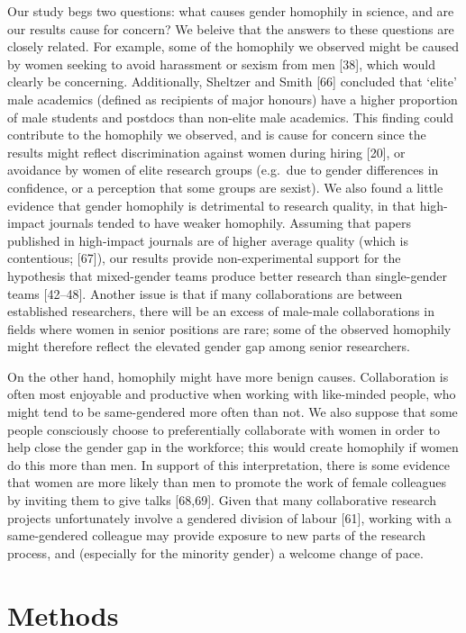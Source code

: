 \documentclass[12pt,]{article}
\begin{document}
Our study begs two questions: what causes gender homophily in science,
and are our results cause for concern? We beleive that the answers to
these questions are closely related. For example, some of the homophily
we observed might be caused by women seeking to avoid harassment or
sexism from men {[}38{]}, which would clearly be concerning.
Additionally, Sheltzer and Smith {[}66{]} concluded that `elite' male
academics (defined as recipients of major honours) have a higher
proportion of male students and postdocs than non-elite male academics.
This finding could contribute to the homophily we observed, and is cause
for concern since the results might reflect discrimination against women
during hiring {[}20{]}, or avoidance by women of elite research groups
(e.g.~due to gender differences in confidence, or a perception that some
groups are sexist). We also found a little evidence that gender
homophily is detrimental to research quality, in that high-impact
journals tended to have weaker homophily. Assuming that papers published
in high-impact journals are of higher average quality (which is
contentious; {[}67{]}), our results provide non-experimental support for
the hypothesis that mixed-gender teams produce better research than
single-gender teams {[}42--48{]}. Another issue is that if many
collaborations are between established researchers, there will be an
excess of male-male collaborations in fields where women in senior
positions are rare; some of the observed homophily might therefore
reflect the elevated gender gap among senior researchers.

On the other hand, homophily might have more benign causes.
Collaboration is often most enjoyable and productive when working with
like-minded people, who might tend to be same-gendered more often than
not. We also suppose that some people consciously choose to
preferentially collaborate with women in order to help close the gender
gap in the workforce; this would create homophily if women do this more
than men. In support of this interpretation, there is some evidence that
women are more likely than men to promote the work of female colleagues
by inviting them to give talks {[}68,69{]}. Given that many
collaborative research projects unfortunately involve a gendered
division of labour {[}61{]}, working with a same-gendered colleague may
provide exposure to new parts of the research process, and (especially
for the minority gender) a welcome change of pace.

\section{Methods}\label{methods}
\end{document}
